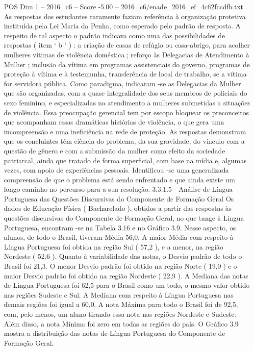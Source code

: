 \begin{textsample}{POS Dim 1 – 2016\_c6 – Score -5.00 – 2016\_c6/enade\_2016\_ef\_4c62fccdfb.txt}
As respostas dos estudantes raramente faziam referência à organização protetiva instituída pela Lei Maria da Penha, como esperado pelo padrão de resposta.
A respeito de tal aspecto o padrão indicava como uma das possibilidades de respostas ( item ‘ b ’ ) : a criação de casas de refúgio ou casa-abrigo, para acolher mulheres vítimas de violência doméstica ; reforço às Delegacias de Atendimento à Mulher ; inclusão da vítima em programas assistenciais do governo, programas de proteção à vítima e à testemunha, transferência de local de trabalho, se a vítima for servidora pública.
Como paradigma, indicaram -se as Delegacias da Mulher que são organizadas, com a quase integralidade dos seus membros de policiais do sexo feminino, e especializadas no atendimento a mulheres submetidas a situações de violência.
Essa preocupação gerencial tem por escopo bloquear os preconceitos que acompanham essas dramáticas histórias de violência, o que gera uma incompreensão e uma ineficiência na rede de proteção.
As respostas demonstram que os concluintes têm ciência do problema, da sua gravidade, do vínculo com a questão de gênero e com a submissão da mulher como efeito da sociedade patriarcal, ainda que tratado de forma superficial, com base na mídia e, algumas vezes, com apoio de experiências pessoais.
Identificou -se uma generalizada compreensão de que o problema está sendo enfrentado e que ainda existe um longo caminho no percurso para a sua resolução. 3.3.1.5 - Análise de Língua Portuguesa das Questões Discursivas do Componente de Formação Geral Os dados de Educação Física ( Bacharelado ), obtidos a partir das respostas às questões discursivas do Componente de Formação Geral, no que tange à Língua Portuguesa, encontram -se na Tabela 3.16 e no Gráfico 3.9.
Nesse aspecto, os alunos, de todo o Brasil, tiveram Média 56,0.
A maior Média com respeito à Língua Portuguesa foi obtida na região Sul ( 57,2 ), e a menor, na região Nordeste ( 52,6 ).
Quanto à variabilidade das notas, o Desvio padrão de todo o Brasil foi 21,3.
O menor Desvio padrão foi obtido na região Norte ( 19,0 ) e o maior Desvio padrão foi obtido na região Nordeste ( 22,9 ).
A Mediana das notas de Língua Portuguesa foi 62,5 para o Brasil como um todo, o mesmo valor obtido nas regiões Sudeste e Sul.
A Mediana com respeito à Língua Portuguesa nas demais regiões foi igual a 60,0.
A nota Máxima para todo o Brasil foi de 92,5, com, pelo menos, um aluno tirando essa nota nas regiões Nordeste e Sudeste.
Além disso, a nota Mínima foi zero em todas as regiões do país.
O Gráfico 3.9 mostra a distribuição das notas de Língua Portuguesa do Componente de Formação Geral.

\end{textsample}
